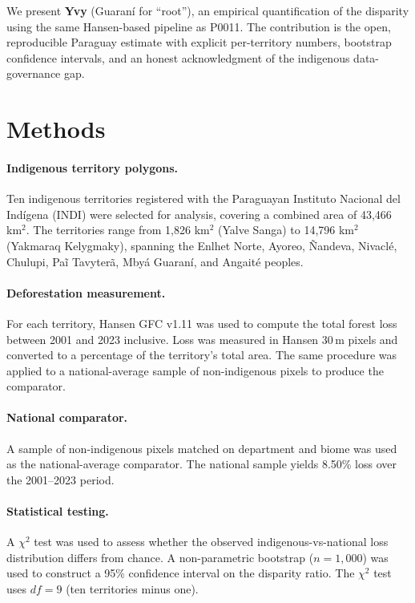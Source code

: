We present \textbf{Yvy} (Guaran\'i for ``root''), an empirical
quantification of the disparity using the same Hansen-based pipeline
as P0011. The contribution is the open, reproducible Paraguay estimate
with explicit per-territory numbers, bootstrap confidence intervals,
and an honest acknowledgment of the indigenous data-governance gap.

\section{Methods}
\label{sec:yvy-methods}

\paragraph{Indigenous territory polygons.} Ten indigenous territories
registered with the Paraguayan Instituto Nacional del Ind\'igena
(INDI) were selected for analysis, covering a combined area of
43{,}466 km$^2$. The territories range from 1{,}826 km$^2$ (Yalve
Sanga) to 14{,}796 km$^2$ (Yakmaraq Kelygmaky), spanning the Enlhet
Norte, Ayoreo, \~Nandeva, Nivaclé, Chulupi, Pa\~i Tavyter\~a, Mby\'a
Guaran\'i, and Angait\'e peoples.

\paragraph{Deforestation measurement.} For each territory, Hansen GFC
v1.11 \citep{hansen2013} was used to compute the total forest loss
between 2001 and 2023 inclusive. Loss was measured in Hansen 30\,m
pixels and converted to a percentage of the territory's total area.
The same procedure was applied to a national-average sample of
non-indigenous pixels to produce the comparator.

\paragraph{National comparator.} A sample of non-indigenous pixels
matched on department and biome was used as the national-average
comparator. The national sample yields 8.50\% loss over the 2001--2023
period.

\paragraph{Statistical testing.} A $\chi^2$ test was used to assess
whether the observed indigenous-vs-national loss distribution differs
from chance. A non-parametric bootstrap ($n = 1{,}000$) was used to
construct a 95\% confidence interval on the disparity ratio. The
$\chi^2$ test uses $df = 9$ (ten territories minus one).

